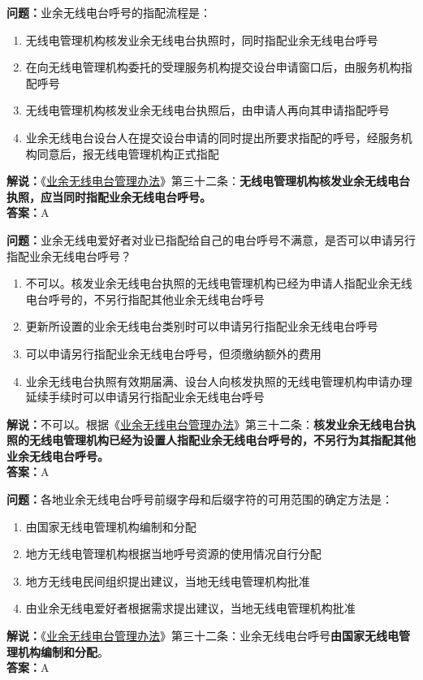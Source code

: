 \textbf{问题：}业余无线电台呼号的指配流程是：
\begin{enumerate}[label=\Alph*), leftmargin=1cm]
	\item 无线电管理机构核发业余无线电台执照时，同时指配业余无线电台呼号
	\item 在向无线电管理机构委托的受理服务机构提交设台申请窗口后，由服务机构指配呼号
	\item 无线电管理机构核发业余无线电台执照后，由申请人再向其申请指配呼号
	\item 业余无线电台设台人在提交设台申请的同时提出所要求指配的呼号，经服务机构同意后，报无线电管理机构正式指配
\end{enumerate}
\textbf{解说：}《\href{https://www.miit.gov.cn/jgsj/zfs/bmgz/art/2020/art_147b69815b3641caad9047735f94c860.html}{业余无线电台管理办法}》第三十二条：\textbf{无线电管理机构核发业余无线电台执照，应当同时指配业余无线电台呼号。}\\\textbf{答案：}A

\textbf{问题：}业余无线电爱好者对业已指配给自己的电台呼号不满意，是否可以申请另行指配业余无线电台呼号？
\begin{enumerate}[label=\Alph*), leftmargin=1cm]
	\item 不可以。核发业余无线电台执照的无线电管理机构已经为申请人指配业余无线电台呼号的，不另行指配其他业余无线电台呼号
	\item 更新所设置的业余无线电台类别时可以申请另行指配业余无线电台呼号
	\item 可以申请另行指配业余无线电台呼号，但须缴纳额外的费用
	\item 业余无线电台执照有效期届满、设台人向核发执照的无线电管理机构申请办理延续手续时可以申请另行指配业余无线电台呼号
\end{enumerate}
\textbf{解说：}不可以。根据《\href{https://www.miit.gov.cn/jgsj/zfs/bmgz/art/2020/art_147b69815b3641caad9047735f94c860.html}{业余无线电台管理办法}》第三十二条：\textbf{核发业余无线电台执照的无线电管理机构已经为设置人指配业余无线电台呼号的，不另行为其指配其他业余无线电台呼号。}\\\textbf{答案：}A

\textbf{问题：}各地业余无线电台呼号前缀字母和后缀字符的可用范围的确定方法是：
\begin{enumerate}[label=\Alph*), leftmargin=1cm]
	\item 由国家无线电管理机构编制和分配
	\item 地方无线电管理机构根据当地呼号资源的使用情况自行分配
	\item 地方无线电民间组织提出建议，当地无线电管理机构批准
	\item 由业余无线电爱好者根据需求提出建议，当地无线电管理机构批准
\end{enumerate}
\textbf{解说：}《\href{https://www.miit.gov.cn/jgsj/zfs/bmgz/art/2020/art_147b69815b3641caad9047735f94c860.html}{业余无线电台管理办法}》第三十二条：业余无线电台呼号\textbf{由国家无线电管理机构编制和分配}。\\\textbf{答案：}A


